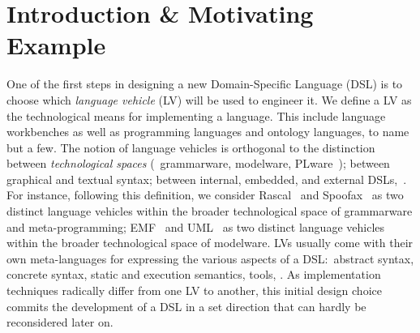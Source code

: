 \section{Introduction \& Motivating Example}
One of the first steps in designing a new Domain-Specific Language (DSL) is to choose which \emph{language vehicle} (LV) will be used to engineer it.
We define a LV as the technological means for implementing a language.
This include language workbenches as well as programming languages and ontology languages, to name but a few.
The notion of language vehicles is orthogonal to the distinction between \emph{technological spaces} (\eg~grammarware, modelware, PLware~\cite{kurtev2002technological}); between graphical and textual syntax; between internal, embedded, and external DSLs,~\etc.
For instance, following this definition, we consider Rascal~\cite{klint2010easy} and Spoofax~\cite{kats2010spoofax} as two distinct language vehicles within the broader technological space of grammarware and meta-programming; EMF~\cite{steinberg2008emf} and UML~\cite{fowler2004uml} as two distinct language vehicles within the broader technological space of modelware.
LVs usually come with their own meta-languages for expressing the various aspects of a DSL:~abstract syntax, concrete syntax, static and execution semantics, tools, \etc.
As implementation techniques radically differ from one LV to another, this initial design choice commits the development of a DSL in a set direction that can hardly be reconsidered later on.

